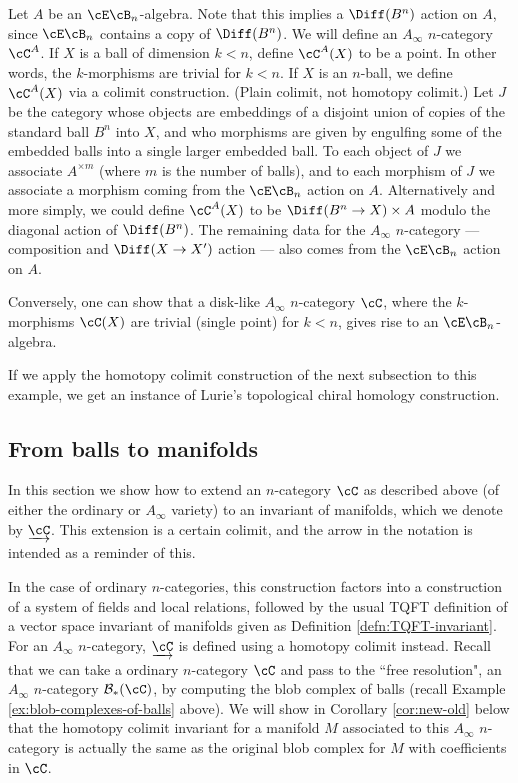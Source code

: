 \begin{example}[$E_n$ algebras]
\rm
\label{ex:e-n-alg}
Let $A$ be an $\cE\cB_n$-algebra.
Note that this implies a $\Diff(B^n)$ action on $A$, 
since $\cE\cB_n$ contains a copy of $\Diff(B^n)$.
We will define an $A_\infty$ $n$-category $\cC^A$.
If $X$ is a ball of dimension $k<n$, define $\cC^A(X)$ to be a point.
In other words, the $k$-morphisms are trivial for $k<n$.
If $X$ is an $n$-ball, we define $\cC^A(X)$ via a colimit construction.
(Plain colimit, not homotopy colimit.)
Let $J$ be the category whose objects are embeddings of a disjoint union of copies of 
the standard ball $B^n$ into $X$, and who morphisms are given by engulfing some of the 
embedded balls into a single larger embedded ball.
To each object of $J$ we associate $A^{\times m}$ (where $m$ is the number of balls), and
to each morphism of $J$ we associate a morphism coming from the $\cE\cB_n$ action on $A$.
Alternatively and more simply, we could define $\cC^A(X)$ to be 
$\Diff(B^n\to X)\times A$ modulo the diagonal action of $\Diff(B^n)$.
The remaining data for the $A_\infty$ $n$-category 
--- composition and $\Diff(X\to X')$ action ---
also comes from the $\cE\cB_n$ action on $A$.

Conversely, one can show that a disk-like $A_\infty$ $n$-category $\cC$, where the $k$-morphisms
$\cC(X)$ are trivial (single point) for $k<n$, gives rise to 
an $\cE\cB_n$-algebra.

If we apply the homotopy colimit construction of the next subsection to this example, 
we get an instance of Lurie's topological chiral homology construction.
\end{example}


\subsection{From balls to manifolds}
\label{ss:ncat_fields} \label{ss:ncat-coend}
In this section we show how to extend an $n$-category $\cC$ as described above 
(of either the ordinary or $A_\infty$ variety) to an invariant of manifolds, which we denote by $\cl{\cC}$.
This extension is a certain colimit, and the arrow in the notation is intended as a reminder of this.

In the case of ordinary $n$-categories, this construction factors into a construction of a 
system of fields and local relations, followed by the usual TQFT definition of a 
vector space invariant of manifolds given as Definition \ref{defn:TQFT-invariant}.
For an $A_\infty$ $n$-category, $\cl{\cC}$ is defined using a homotopy colimit instead.
Recall that we can take a ordinary $n$-category $\cC$ and pass to the ``free resolution", 
an $A_\infty$ $n$-category $\bc_*(\cC)$, by computing the blob complex of balls 
(recall Example \ref{ex:blob-complexes-of-balls} above).
We will show in Corollary \ref{cor:new-old} below that the homotopy colimit invariant 
for a manifold $M$ associated to this $A_\infty$ $n$-category is actually the 
same as the original blob complex for $M$ with coefficients in $\cC$.

